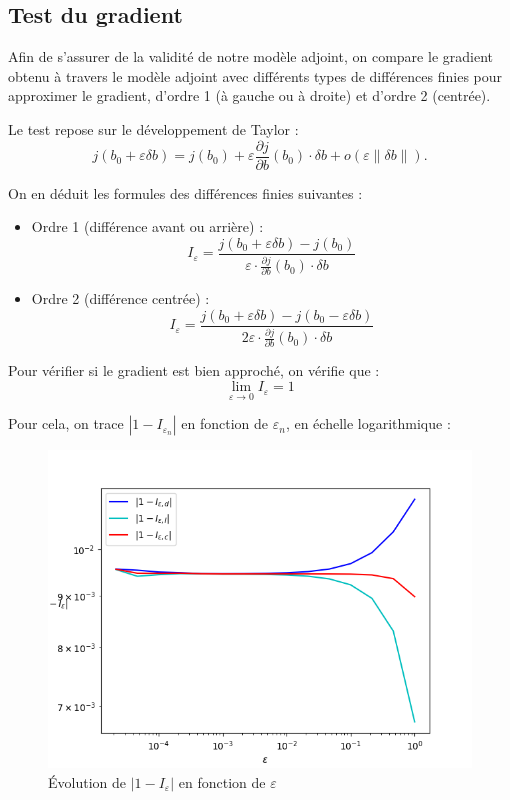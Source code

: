 \documentclass{article}
\begin{document}
\subsection{Test du gradient}

Afin de s'assurer de la validité de notre modèle adjoint, on compare le gradient obtenu à travers le modèle adjoint avec différents types de différences finies pour approximer le gradient, d'ordre 1 (à gauche ou à droite) et d'ordre 2 (centrée).

Le test repose sur le développement de Taylor :
\[
j(b_0 + \varepsilon \delta b) = j(b_0) + \varepsilon \frac{\partial j}{\partial b}(b_0) \cdot \delta b + o(\varepsilon \| \delta b \|).
\]

On en déduit les formules des différences finies suivantes :

\begin{itemize}
    \item Ordre 1 (différence avant ou arrière) :
    \[
    I_\varepsilon = \frac{j(b_0 + \varepsilon \delta b) - j(b_0)}{\varepsilon \cdot \frac{\partial j}{\partial b}(b_0) \cdot \delta b}
    \]
    
    \item Ordre 2 (différence centrée) :
    \[
    I_\varepsilon = \frac{j(b_0 + \varepsilon \delta b) - j(b_0 - \varepsilon \delta b)}{2 \varepsilon \cdot \frac{\partial j}{\partial b}(b_0) \cdot \delta b}
    \]
\end{itemize}

Pour vérifier si le gradient est bien approché, on vérifie que :
\[
\lim_{\varepsilon \to 0} I_\varepsilon = 1
\]

Pour cela, on trace \( \left| 1 - I_{\varepsilon_n} \right| \) en fonction de \( \varepsilon_n \), en échelle logarithmique :

\begin{figure}[H]
    \centering
    \includegraphics[width=0.8\linewidth]{Images_Axel/grad2.png}
    \caption{Évolution de \( | 1 - I_\varepsilon | \) en fonction de \( \varepsilon \) }
    \label{fig:grad-test}
\end{figure}
\end{document}

